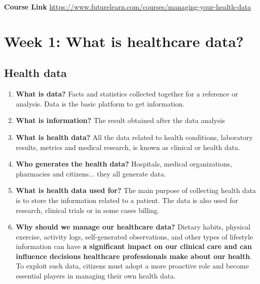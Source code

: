 \documentclass[10pt, twoside]{article}   	%
\begin{document}
\restoregeometry %
\nopagecolor%

\raggedbottom

\newpage
\tableofcontents %
\vfill
\noindent
\listoffigures
\vfill
\noindent
\textbf{Course Link} \url{https://www.futurelearn.com/courses/managing-your-health-data} 
\pagebreak
\section{Week 1: What is healthcare data?}
\subsection{Health data}
\begin{enumerate}
\item \textbf{What is data?} Facts and statistics collected together for a reference or analysis. Data is the basic platform to get information. 
\item \textbf{What is information?} The result obtained after the data analysis
\item \textbf{What is health data?}  All the data related to health conditions, laboratory results, metrics and medical research, is known as clinical or health data.
\item \textbf{Who generates the health data?} Hospitals, medical organizations, pharmacies and citizens... they all generate data. 
\item \textbf{What is health data used for?} The main purpose of collecting health data is to store the information related to a patient. The data is also used for research, clinical trials or in some cases billing.
\item \textbf{Why should we manage our healthcare data?} Dietary habits, physical exercise, activity logs, self-generated observations, and other types of lifestyle information can have \textbf{a significant impact on our clinical care and can influence decisions healthcare professionals make about our health}. To exploit such data, citizens must adopt a more proactive role and become essential players in managing their own health data.
\end {enumerate}
\end{document}
